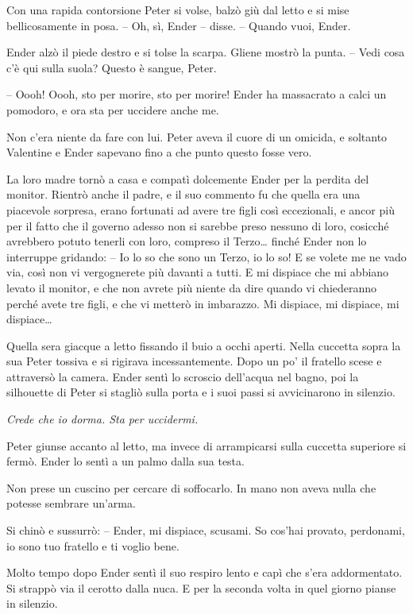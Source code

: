 {Con una rapida contorsione Peter si volse, balzò giù dal letto e si
	mise bellicosamente in posa. -- Oh, sì, Ender -- disse. -- Quando vuoi,
	Ender.}

{Ender alzò il piede destro e si tolse la scarpa. Gliene mostrò la
	punta. -- Vedi cosa c'è qui sulla suola? Questo è sangue, Peter.}

{-- Oooh! Oooh, sto per morire, sto per morire! Ender ha massacrato a
	calci un pomodoro, e ora sta per uccidere anche me.}

{Non c'era niente da fare con lui. Peter aveva il cuore di un omicida, e
	soltanto Valentine e Ender sapevano fino a che punto questo fosse vero.}

{La loro madre tornò a casa e compatì dolcemente Ender per la perdita
	del monitor. Rientrò anche il padre, e il suo commento fu che quella era
	una piacevole sorpresa, erano fortunati ad avere tre figli così
	eccezionali, e ancor più per il fatto che il governo adesso non si
	sarebbe preso nessuno di loro, cosicché avrebbero potuto tenerli con
	loro, compreso il Terzo\ldots{} finché Ender non lo interruppe gridando:
	-- Io lo so che sono un Terzo, io lo so! E se volete me ne vado via,
	così non vi vergognerete più davanti a tutti. E mi dispiace che mi
	abbiano levato il monitor, e che non avrete più niente da dire quando vi
	chiederanno perché avete tre figli, e che vi metterò in imbarazzo. Mi
	dispiace, mi dispiace, mi dispiace\ldots{}}

{Quella sera giacque a letto fissando il buio a occhi aperti. Nella
	cuccetta sopra la sua Peter tossiva e si rigirava incessantemente. Dopo
	un po' il fratello scese e attraversò la camera. Ender sentì lo scroscio
	dell'acqua nel bagno, poi la silhouette di Peter si stagliò sulla porta
	e i suoi passi si avvicinarono in silenzio.}

\emph{{Crede che io dorma. Sta per uccidermi.}}

{Peter giunse accanto al letto, ma invece di arrampicarsi sulla cuccetta
	superiore si fermò. Ender lo sentì a un palmo dalla sua testa.}

{Non prese un cuscino per cercare di soffocarlo. In mano non aveva nulla
	che potesse sembrare un'arma.}

{Si chinò e sussurrò: -- Ender, mi dispiace, scusami. So cos'hai
	provato, perdonami, io sono tuo fratello e ti voglio bene.}

{Molto tempo dopo Ender sentì il suo respiro lento e capì che s'era
	addormentato. Si strappò via il cerotto dalla nuca. E per la seconda
	volta in quel giorno pianse in silenzio.}

\label{Orsonux20Scottux20Cardux20-ux20Ilux20Giocoux20Diux20Enderux20-ux20BY_SLY70A1_split_005.htm}{}
